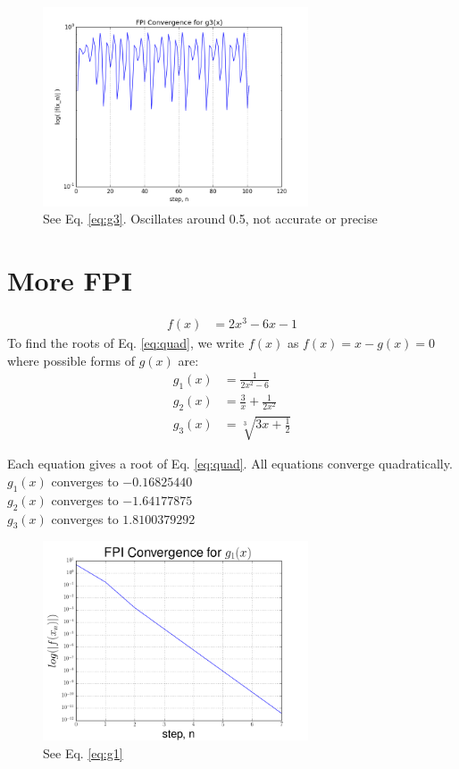 \documentclass[12pt]{article}
\begin{document}
  \begin{figure}[h]
    \centering
    \includegraphics[width=0.7\textwidth]{Problem4dc.png}
    \caption{See Eq. \ref{eq:g3}. Oscillates around 0.5, not accurate or precise}
  \end{figure}

  \clearpage

  \section{More FPI}

  \begin{align}
    \label{eq:quad}
    f(x) &= 2x^3 - 6x -1
  \end{align}
  To find the roots of Eq. \ref{eq:quad}, we write $f(x)$ as $f(x)=x-g(x)=0$
  where possible forms of $g(x)$ are:
  \begin{align}
    \label{eq:g1}
    g_1(x) &= \frac{1}{2x^2-6} \\
    \label{eq:g2}
    g_2(x) &= \frac{3}{x}+\frac{1}{2x^2} \\
    \label{eq:g3}
    g_3(x) &= \sqrt[3]{3x + \frac{1}{2}}
  \end{align}

  Each equation gives a root of Eq. \ref{eq:quad}. All equations converge
  quadratically.\\
  $g_1(x)$ converges to $-0.16825440$\\
  $g_2(x)$ converges to $-1.64177875$\\
  $g_3(x)$ converges to $1.8100379292$

  \begin{figure}[h]
    \centering
    \includegraphics[width=0.7\textwidth]{Problem5a.png}
    \caption{See Eq. \ref{eq:g1}}
  \end{figure}
  
\end{document}
